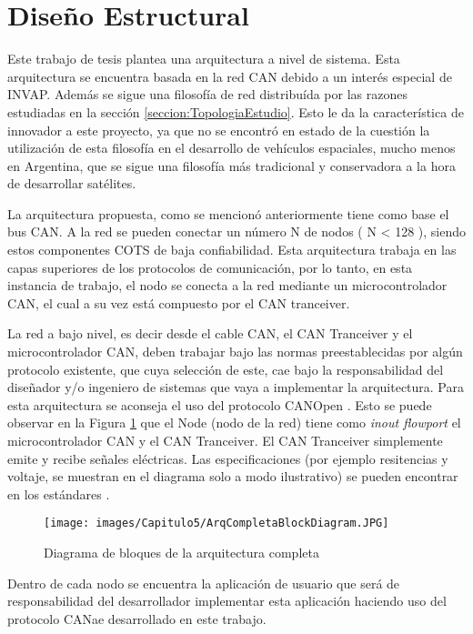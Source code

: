 \section{Diseño Estructural}\label{sec:dis_estructural}
Este trabajo de tesis plantea una arquitectura a nivel de sistema.
Esta arquitectura se encuentra basada en la red CAN debido a
un interés especial de INVAP. Además se sigue una filosofía de red
distribuída por las razones estudiadas en la sección
\ref{seccion:TopologiaEstudio}. Esto le da la característica de innovador
a este proyecto, ya que no se encontró en estado de la cuestión
la utilización de esta filosofía en el desarrollo de vehículos
espaciales, mucho menos en Argentina, que se sigue una filosofía
más tradicional y conservadora a la hora de desarrollar satélites. 

La arquitectura propuesta, como se mencionó anteriormente tiene como
base el bus CAN. A la red se pueden conectar un número N de
nodos ( N < 128 ), siendo estos componentes COTS de baja confiabilidad. 
Esta arquitectura trabaja en las capas superiores 
de los protocolos de comunicación, por lo tanto, en esta instancia 
de trabajo, el nodo se conecta a la red mediante un microcontrolador 
CAN, el cual a su vez está compuesto por el CAN tranceiver.

La red a bajo nivel, es decir desde el cable CAN, el CAN Tranceiver y 
el microcontrolador CAN, deben trabajar bajo las normas preestablecidas
por algún protocolo existente, que cuya selección de este, cae bajo la 
responsabilidad del diseñador y/o ingeniero de sistemas que vaya 
a implementar la arquitectura. Para esta arquitectura se aconseja el uso
del protocolo CANOpen \citep{can-ciaWEB}. Esto se puede observar en la
 Figura \ref{fig:DiagramaEstructuraCompleta} que el Node (nodo de la red)
tiene como \textit{inout flowport} el microcontrolador CAN  y el
CAN Tranceiver. El CAN Tranceiver simplemente emite y recibe señales eléctricas. Las 
especificaciones (por ejemplo resitencias y voltaje, se muestran en el diagrama solo
a modo ilustrativo) se pueden encontrar en los estándares \citep{can-ciaWEB}.

\begin{figure}[h!]
 \centering
 \texttt{[image: images/Capitulo5/ArqCompletaBlockDiagram.JPG]}
  \caption{Diagrama de bloques de la arquitectura completa}
\label{fig:DiagramaEstructuraCompleta}
\end{figure} 

Dentro de cada nodo se encuentra la aplicación de usuario que será de 
responsabilidad del desarrollador implementar esta aplicación haciendo uso
del protocolo CANae desarrollado en este trabajo.

